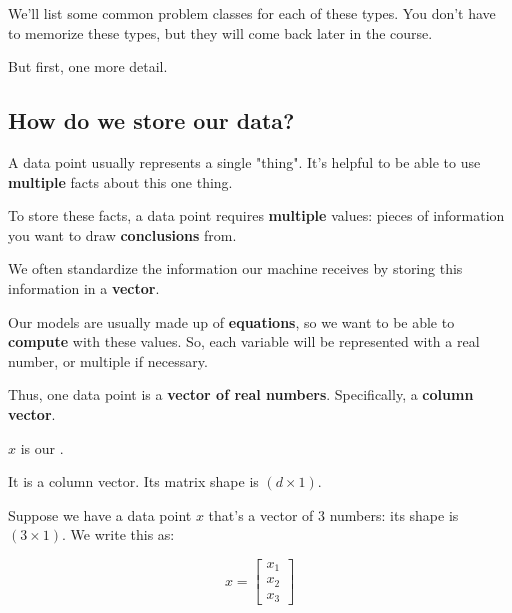         We'll list some common problem classes for each of these types. You don't have to memorize these types, but they will come back later in the course.
        
        But first, one more detail.
        
        \subsection{How do we store our data?}
        
            A data point usually represents a single "thing". It's helpful to be able to use \textbf{multiple} facts about this one thing.
            
            To store these facts, a data point requires \textbf{multiple} values: pieces of information you want to draw \textbf{conclusions} from.
            
            We often standardize the information our machine receives by storing this information in a \textbf{vector}.
            
            Our models are usually made up of \textbf{equations}, so we want to be able to \textbf{compute} with these values. So, each variable will be represented with a real number, or multiple if necessary.
            
            Thus, one data point is a \textbf{vector of real numbers}. Specifically, a \textbf{column vector}.\\
            
            \begin{notation}
                $x$ is our .
                
                It is a column vector. Its matrix shape is $(d \times 1)$.
            \end{notation}
            
            \miniex Suppose we have a data point $x$ that's a vector of 3 numbers: its shape is $(3 \times 1)$. We write this as:
            
            \begin{equation}
                x = 
                \begin{bmatrix}
                    x_1 \\ x_2 \\ x_3
                \end{bmatrix}
            \end{equation}
            
